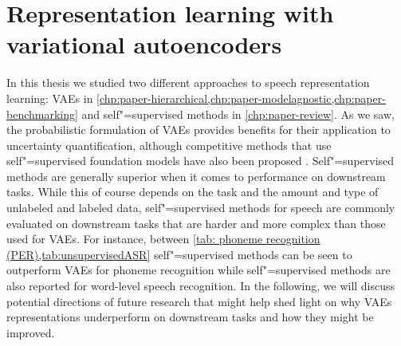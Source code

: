 \section{Representation learning with variational autoencoders}
%
In this thesis we studied two different approaches to speech representation learning: VAEs in \cref{chp:paper-hierarchical,chp:paper-modelagnostic,chp:paper-benchmarking} and self"=supervised methods in \cref{chp:paper-review}. 
As we saw, the probabilistic formulation of VAEs provides benefits for their application to uncertainty quantification, although competitive methods that use self"=supervised foundation models have also been proposed \textcite{xiao_we_2021,hendrycks_using_2019,bergman_classificationbased_2020}. Self"=supervised methods are generally superior when it comes to performance on downstream tasks. While this of course depends on the task and the amount and type of unlabeled and labeled data, self"=supervised methods for speech are commonly evaluated on downstream tasks that are harder and more complex than those used for VAEs. For instance, between \cref{tab: phoneme recognition (PER),tab:unsupervisedASR} self"=supervised methods can be seen to outperform VAEs for phoneme recognition while self"=supervised methods are also reported for word-level speech recognition. 
In the following, we will discuss potential directions of future research that might help shed light on why VAEs representations underperform on downstream tasks and how they might be improved.




